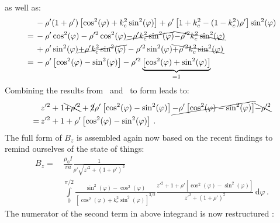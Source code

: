 as well as:
\begin{align}
 ~&\, - \rho' (1+\rho') \left[ \cos^2(\varphi) + k_c^2 \sin^2(\varphi) \right] + \rho' \left[1 + k_c^2 - (1 - k_c^2) \rho'\right] \sin^2(\varphi) \nonumber \\
 =&\, - \rho' \cos^2(\varphi) - \rho'^2 \cos^2(\varphi) \cancel{- \rho' k_c^2 \sin^2(\varphi)}                           \bcancel{- \rho'^2 k_c^2 \sin^2(\varphi)} \nonumber \\
 ~&\, + \rho' \sin^2(\varphi)                           \cancel{+ \rho' k_c^2 \sin^2(\varphi)} - \rho'^2 \sin^2(\varphi) \bcancel{+ \rho'^2 k_c^2 \sin^2(\varphi)} \nonumber \\
 =&\, - \rho' \left[ \cos^2(\varphi) - \sin^2(\varphi) \right] - \rho'^2 \underbrace{\left[ \cos^2(\varphi) + \sin^2(\varphi) \right]}_{=1} \label{eqn:intermediate2}
\end{align}
Combining the results from~ and~ to form  leads to:
\begin{align}
 ~&\, z'^2 + 1 \bcancel{+ \rho'^2} + \cancel{2} \rho' \left[ \cos^2(\varphi) - \sin^2(\varphi) \right] \cancel{- \rho' \left[ \cos^2(\varphi) - \sin^2(\varphi) \right]} \bcancel{- \rho'^2} \nonumber \\
 =&\, z'^2 + 1 + \rho' \left[ \cos^2(\varphi) - \sin^2(\varphi) \right] \, .
\end{align}
The full form of $B_z$ is assembled again now based on the recent findings to remind ourselves of the state of things:
\begin{align}
 B_z
 =&\, \frac{\mu_0 I}{\pi a}
      \frac{1}{\rho' \sqrt{z'^2 + (1 + \rho')^2}} \nonumber \\
 ~&\, \int\limits_0^{\pi/2}
        \frac{\sin^2(\varphi) - \cos^2(\varphi)}
             {\left[\cos^2(\varphi) + k_c^2 \sin^2(\varphi) \right]^{3/2}}
        \frac{z'^2 + 1 + \rho' \left[ \cos^2(\varphi) - \sin^2(\varphi) \right]}{z'^2 + (1 + \rho')^2}
        \,\mathrm{d}\varphi \, . \label{eqn:B_z_core}
\end{align}
The numerator of the second term in above integrand is now restructured :
